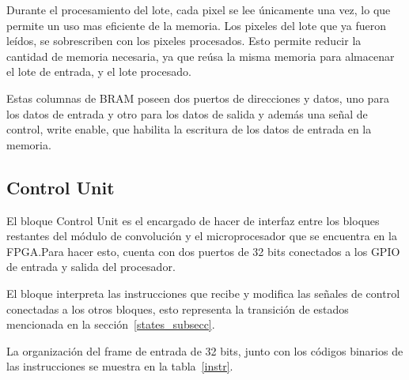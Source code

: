 Durante el procesamiento del lote, cada pixel se lee únicamente una vez, lo que
permite un uso mas eficiente de la memoria. Los pixeles del lote que ya fueron
leídos, se sobrescriben con los pixeles procesados. Esto permite reducir la
cantidad de memoria necesaria, ya que reúsa la misma memoria para almacenar el
lote de entrada, y el lote procesado.

Estas columnas de BRAM poseen dos puertos de direcciones y datos, uno para
los datos de entrada y otro para los datos de salida y además una señal de
control, write enable, que habilita la escritura de los datos de entrada en la memoria.

\subsection{Control Unit}\label{sec:ctrl_u}
El bloque Control Unit es el encargado de hacer de interfaz entre los bloques
restantes del módulo de convolución y el microprocesador que se encuentra en la
FPGA.\@ Para hacer esto, cuenta con dos puertos de 32 bits conectados a los GPIO
de entrada y salida del procesador.

El bloque interpreta las instrucciones que recibe y modifica las señales de
control conectadas a los otros bloques, esto representa la transición de
estados mencionada en la sección~\ref{states_subsecc}.

La organización del frame de entrada de 32 bits, junto con los códigos binarios
de las instrucciones se muestra en la tabla~\ref{instr}.

